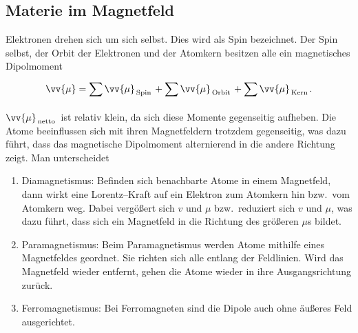 \documentclass[a4paper,12pt]{article}
\begin{document}
\subsection{Materie im Magnetfeld}
Elektronen \glqq drehen\grqq{} sich um sich selbst. Dies wird als Spin bezeichnet. Der Spin selbst, der Orbit der Elektronen und der Atomkern besitzen alle ein magnetisches Dipolmoment
\begin{align*} 
        \vv{\mu }=\sum_{}^{}\vv{\mu }_{\,\text{Spin}\,}+\sum_{}^{}\vv{\mu }_{\,\text{Orbit}\,}+\sum_{}^{}\vv{\mu }_{\,\text{Kern}\,}
.\end{align*} 
$\vv{\mu }_{\,\text{netto}\,}$ ist relativ klein, da sich diese Momente gegenseitig aufheben. Die Atome beeinflussen sich mit ihren Magnetfeldern trotzdem gegenseitig, was dazu führt, dass das magnetische Dipolmoment alternierend in die andere Richtung zeigt. Man unterscheidet
\begin{enumerate}[label=$\circ$]
        \item Diamagnetismus: Befinden sich benachbarte Atome in einem Magnetfeld, dann wirkt eine Lorentz--Kraft auf ein Elektron zum Atomkern hin bzw.\ vom Atomkern weg. Dabei vergößert sich $v$ und $\mu $ bzw.\ reduziert sich $v$ und $\mu $, was dazu führt, dass sich ein Magnetfeld in die Richtung des größeren $\mu $s bildet.
        \item Paramagnetismus: Beim Paramagnetismus werden Atome mithilfe eines Magnetfeldes geordnet. Sie richten sich alle entlang der Feldlinien. Wird das Magnetfeld wieder entfernt, gehen die Atome wieder in ihre Ausgangsrichtung zurück.
        \item Ferromagnetismus: Bei Ferromagneten sind die Dipole auch ohne äußeres Feld ausgerichtet. 
\end{enumerate}
\end{document}
